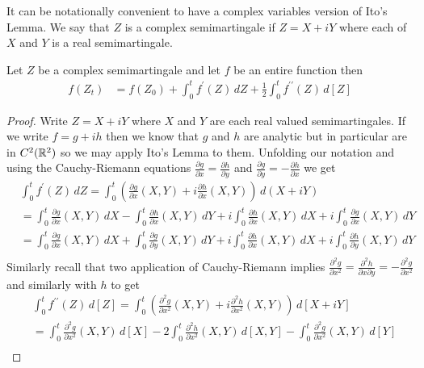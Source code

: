 It can be notationally convenient to have a complex variables version of Ito's Lemma.  We say that $Z$ is a complex semimartingale if $Z = X + iY$ where each of $X$ and $Y$ is a real semimartingale.  
\begin{cor}\label{ItoLemmaContinuousSemimartingaleEntireFunction}Let $Z$ be a complex semimartingale and let $f$ be an entire function then
\begin{align*}
f(Z_t) &= f(Z_0) + \int_0^t f^{\prime}(Z) \, dZ + \frac{1}{2} \int_0^t f^{\prime \prime}(Z) \, d[Z]
\end{align*}
\end{cor}
\begin{proof}
Write $Z = X + iY$ where $X$ and $Y$ are each real valued semimartingales.  If we write $f = g + ih$ then we know that $g$ and $h$ are analytic but in particular are in $C^2(\mathbb{R}^2)$ so we may apply Ito's Lemma to them.  Unfolding our notation and using the Cauchy-Riemann equations $\frac{\partial g}{\partial x} = \frac{\partial h}{\partial y}$ and  $\frac{\partial g}{\partial y} =  -\frac{\partial h}{\partial x}$  we get 
\begin{align*}
&\int_0^t f^{\prime}(Z) \, dZ = \int_0^t (\frac {\partial g}{\partial x}(X,Y) + i \frac {\partial h}{\partial x}(X,Y) ) \, d(X + iY) \\
&= \int_0^t \frac {\partial g}{\partial x}(X,Y) \, dX - \int_0^t \frac {\partial h}{\partial x}(X,Y)  \, dY + i \int_0^t \frac {\partial h}{\partial x}(X,Y) \, dX + i \int_0^t \frac {\partial g}{\partial x}(X,Y) \, dY \\
&= \int_0^t \frac {\partial g}{\partial x}(X,Y) \, dX + \int_0^t \frac {\partial g}{\partial y}(X,Y)  \, dY + i \int_0^t \frac {\partial h}{\partial x}(X,Y) \, dX + i \int_0^t \frac {\partial h}{\partial y}(X,Y) \, dY \\
\end{align*}
Similarly recall that two application of Cauchy-Riemann implies $\frac{\partial^2 g}{\partial x^2} = \frac{\partial^2 h}{\partial x \partial y} = -\frac{\partial^2 g}{\partial x^2}$ and similarly with $h$ to get
\begin{align*}
&\int_0^t f^{\prime \prime}(Z) \, d[Z] = \int_0^t (\frac {\partial^2 g}{\partial x^2}(X,Y) + i \frac {\partial^2 h}{\partial x^2}(X,Y) ) \, d[X + iY] \\
&= \int_0^t \frac {\partial^2 g}{\partial x^2}(X,Y) \, d[X] - 2 \int_0^t \frac {\partial^2 h}{\partial x^2}(X,Y)  \, d[X,Y] -\int_0^t \frac {\partial^2 g}{\partial x^2}(X,Y) \, d[Y] \\ 

\end{align*}
\end{proof}
